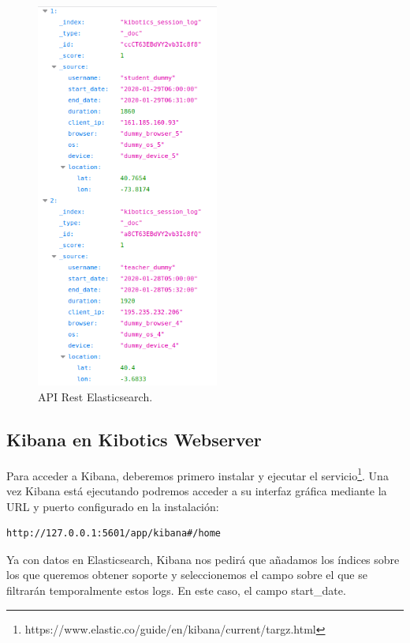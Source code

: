\documentclass[11pt,a4paper]{book}
\begin{document}
				\begin{figure}[H]
					\centering
					\includegraphics[width=6cm, keepaspectratio]{img/api_elasticsearch.png}
					\caption{API Rest Elasticsearch.}
					\label{fig:api_elasticsearch}
				\end{figure}

			\subsection{Kibana en Kibotics Webserver}
				
				Para acceder a Kibana, deberemos primero instalar y ejecutar el servicio\footnote{https://www.elastic.co/guide/en/kibana/current/targz.html}. Una vez Kibana está ejecutando podremos acceder a su interfaz gráfica mediante la URL y puerto configurado en la instalación:
				
				\begin{Verbatim}[tabsize=4]	
http://127.0.0.1:5601/app/kibana#/home
				\end{Verbatim}
				
				Ya con datos en Elasticsearch, Kibana nos pedirá que añadamos los índices sobre los que queremos obtener soporte y seleccionemos el campo sobre el que se filtrarán temporalmente estos logs. En este caso, el campo start\_date.
\end{document}
